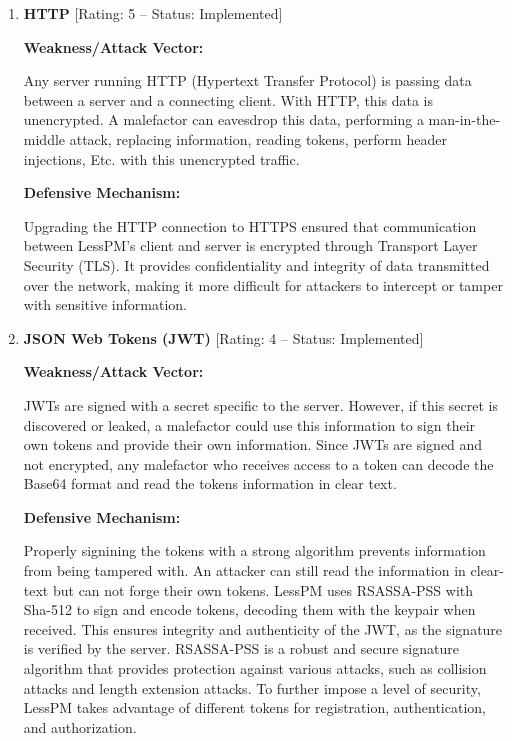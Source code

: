 \begin{enumerate}[label=$\blacktriangleright$]
  \item \textbf{HTTP} [Rating: 5 -- Status: Implemented]

  \textbf{Weakness/Attack Vector:}

  Any server running HTTP (Hypertext Transfer Protocol) is passing data
  between a server and a connecting client.
  With HTTP, this data is unencrypted.
  A malefactor can eavesdrop this data, performing a man-in-the-middle attack,
  replacing information, reading tokens, perform header injections, Etc.
  with this unencrypted traffic.

  \textbf{Defensive Mechanism:}

  Upgrading the HTTP connection to HTTPS ensured that communication between
  LessPM's client and server is encrypted through Transport Layer
  Security (TLS).
  It provides confidentiality and integrity of data transmitted over the
  network, making it more difficult for attackers to intercept or tamper with
  sensitive information.

  \item \textbf{JSON Web Tokens (JWT)} [Rating: 4 -- Status: Implemented]

  \textbf{Weakness/Attack Vector:}

  JWTs are signed with a secret specific to the server.
  However, if this secret is discovered or leaked, a malefactor could use this
  information to sign their own tokens and provide their own information.
  Since JWTs are signed and not encrypted, any malefactor who receives access
  to a token can decode the Base64 format and read the tokens information in
  clear text.

  \textbf{Defensive Mechanism:}

  Properly signining the tokens with a strong algorithm prevents information
  from being tampered with.
  An attacker can still read the information in clear-text but can not forge
  their own tokens.
  LessPM uses RSASSA-PSS with Sha-512 to sign and encode tokens, decoding
  them with the keypair when received.
  This ensures integrity and authenticity of the JWT, as the signature is
  verified by the server.
  RSASSA-PSS is a robust and secure signature algorithm that provides protection
  against various attacks, such as collision attacks and length extension
  attacks.
  To further impose a level of security, LessPM takes advantage of different
  tokens for registration, authentication, and authorization.


\end{enumerate}
